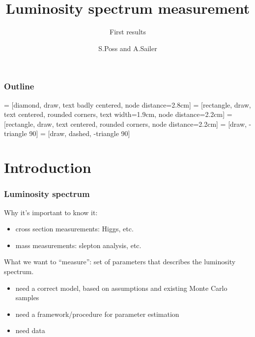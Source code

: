 \documentclass[handout]{beamer}
\author{S.Poss and A.Sailer}
\title{Luminosity spectrum measurement}
\subtitle{First results}
\begin{document}
\begin{frame}
\titlepage
\end{frame}
\begin{frame}
\frametitle{Outline}
\tableofcontents
\end{frame}
 = [diamond, draw, text badly centered, node distance=2.8cm]
 = [rectangle, draw, text centered, rounded corners, text width=1.9cm, node distance=2.2cm]
 = [rectangle, draw, text centered, rounded corners, node distance=2.2cm]
 = [draw, -triangle 90]
 = [draw, dashed, -triangle 90]
\section{Introduction}
\begin{frame}
\frametitle{Luminosity spectrum}
Why it's important to know it:
\begin{itemize}
\item cross section measurements: Higgs, etc.
\item mass measurements: slepton analysis, etc.
\end{itemize}
What we want to ``measure'': set of parameters that describes the luminosity
spectrum.
\begin{itemize}
\item need a correct model, based on assumptions and existing Monte Carlo
samples
\item need a framework/procedure for parameter estimation
\item need data 
\end{itemize}
\end{frame}
\end{document}
